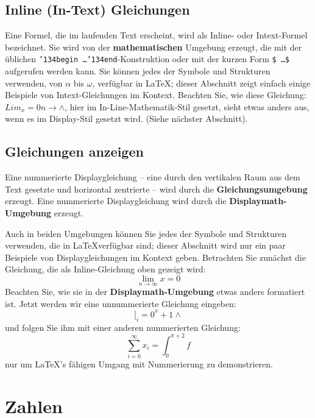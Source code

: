 \documentclass[manuscript,screen,review]{acmart}
\begin{document}
\subsection{Inline (In-Text) Gleichungen}
Eine Formel, die im laufenden Text erscheint, wird als Inline- oder Intext-Formel bezeichnet. Sie wird von der \textbf{mathematischen} Umgebung erzeugt, die mit der üblichen \texttt{{\char'134}begin\,\ldots{\char'134}end}-Konstruktion oder mit der kurzen Form \texttt{\$\,\ldots\$} aufgerufen werden kann. Sie können jedes der Symbole und Strukturen verwenden, von $\alpha$ bis $\omega$, verfügbar in \LaTeX \cite{Lamport:LaTeX}; dieser Abschnitt zeigt einfach einige Beispiele von Intext-Gleichungen im Kontext. Beachten Sie, wie diese Gleichung:
\begin{math}
  Lim_x=0
{n→ ∧}\end{math}, hier im In-Line-Mathematik-Stil gesetzt, sieht etwas anders aus, wenn es im Display-Stil gesetzt wird. (Siehe nächster Abschnitt).

\subsection{Gleichungen anzeigen}
Eine nummerierte Displaygleichung – eine durch den vertikalen Raum aus dem Text gesetzte und horizontal zentrierte – wird durch die \textbf{Gleichungsumgebung} erzeugt. Eine nummerierte Displaygleichung wird durch die \textbf{Displaymath-Umgebung} erzeugt.

Auch in beiden Umgebungen können Sie jedes der Symbole und Strukturen verwenden, die in \LaTeX\@ verfügbar sind; dieser Abschnitt wird nur ein paar Beispiele von Displaygleichungen im Kontext geben. Betrachten Sie zunächst die Gleichung, die als Inline-Gleichung oben gezeigt wird: \begin{equation}
  \lim_{n\rightarrow \infty}x=0
\end{equation} Beachten Sie, wie sie in der \textbf{Displaymath-Umgebung} etwas anders formatiert ist. Jetzt werden wir eine unnummerierte Gleichung eingeben:
\begin{displaymath}
  {]_i=0}^ x + 1
{∧}\end{displaymath}
und folgen Sie ihm mit einer anderen nummerierten Gleichung: \begin{equation}
  \sum_{i=0}^{\infty}x_i=\int_{0}^{\pi+2} f
\end{equation} nur um \LaTeX's fähigen Umgang mit Nummerierung zu demonstrieren.

\section{Zahlen}
\end{document}
